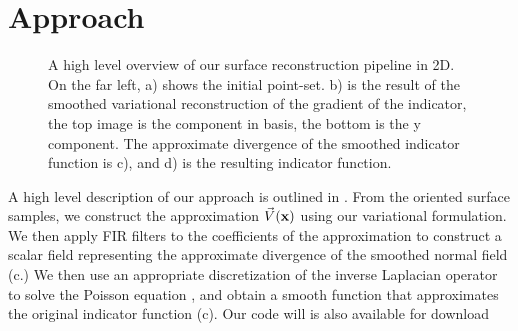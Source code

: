 \section{Approach}
\label{sec:pipeline}
\begin{figure*} 
	\centering
	
	\caption{A high level overview of our surface reconstruction pipeline in 2D. On the far left, a) shows the initial point-set. b) is the result of the smoothed variational reconstruction of the gradient of the indicator, the top image is the component in basis, the bottom is the y component. The approximate divergence of the smoothed indicator function is c), and d) is the resulting indicator function. }
	\label{fig:pipeline}
\end{figure*}

A high level description of our approach is outlined in . From the oriented surface samples, we construct the approximation $\vec{V}(\mathbf{x})$ using our variational formulation. We then apply FIR filters to the coefficients of the approximation to construct a scalar field representing the approximate divergence of the smoothed normal field (c.) We then use an appropriate discretization of the inverse Laplacian operator to solve the Poisson equation , and obtain a smooth function that approximates the original indicator function (c). Our code will is also available for download 


